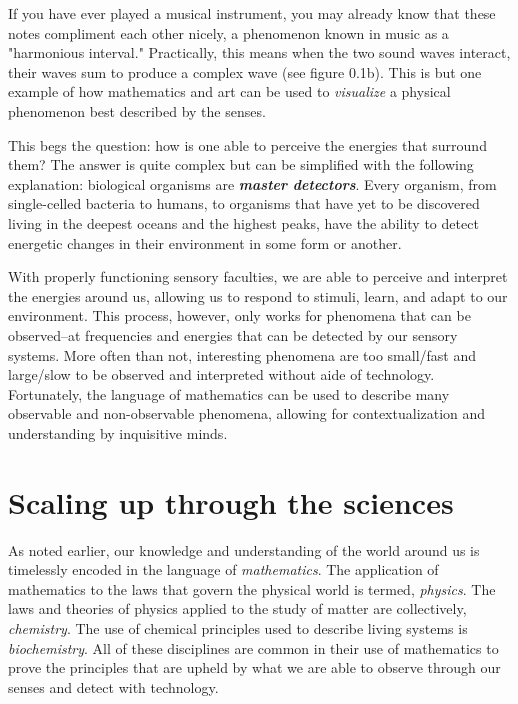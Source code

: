 \documentclass[12pt]{ucsddissertation}
\begin{document}
\begin{dissertationintroduction}
If you have ever played a musical instrument, you may already know that these notes compliment each other nicely, a phenomenon known in music as a "harmonious interval." Practically, this means when the two sound waves interact, their waves sum to produce a complex wave (see figure 0.1b). This is but one example of how mathematics and art can be used to \textit{visualize} a physical phenomenon best described by the senses.

This begs the question: how is one able to perceive the energies that surround them? The answer is quite complex but can be simplified with the following explanation: biological organisms are \textit{\textbf{master detectors}}. Every organism, from single-celled bacteria to humans, to organisms that have yet to be discovered living in the deepest oceans and the highest peaks, have the ability to detect energetic changes in their environment in some form or another. 

With properly functioning sensory faculties, we are able to perceive and interpret the energies around us, allowing us to respond to stimuli, learn, and adapt to our environment. This process, however, only works for phenomena that can be observed--at frequencies and energies that can be detected by our sensory systems. More often than not, interesting phenomena are too small/fast and large/slow to be observed and interpreted without aide of technology. Fortunately, the language of mathematics can be used to describe many observable and non-observable phenomena, allowing for contextualization and understanding by inquisitive minds.

\section{Scaling up through the sciences}
As noted earlier, our knowledge and understanding of the world around us is timelessly encoded in the language of \textit{mathematics}. The application of mathematics to the laws that govern the physical world is termed, \textit{physics}. The laws and theories of physics applied to the study of matter are collectively, \textit{chemistry}. The use of chemical principles used to describe living systems is \textit{biochemistry}. All of these disciplines are common in their use of mathematics to prove the principles that are upheld by what we are able to observe through our senses and detect with technology. 


\end{dissertationintroduction}
\end{document}
